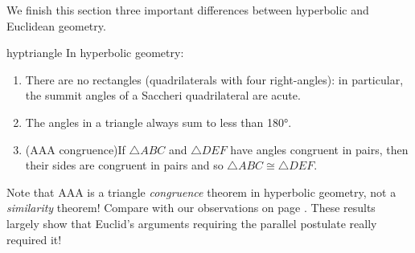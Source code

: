 \goodbreak



We finish this section three important differences between hyperbolic and Euclidean geometry.

\begin{thm}{}{hyptriangle}
In hyperbolic geometry:
\begin{enumerate}\itemsep0pt
  \item There are no rectangles (quadrilaterals with four right-angles): in particular, the summit angles of a Saccheri quadrilateral are acute.
  \item The angles in a triangle always sum to less than \ang{180}.
  \item (AAA congruence)\lstsp If $\triangle ABC$ and $\triangle DEF$ have angles congruent in pairs, then their sides are congruent in pairs and so $\triangle ABC\cong\triangle DEF$.
\end{enumerate}
\end{thm}

Note that AAA is a triangle \emph{congruence} theorem in hyperbolic geometry, not a \emph{similarity} theorem! Compare with our observations on page \pageref{pg:absolute}. These results largely show that Euclid's arguments requiring the parallel postulate really required it! 








